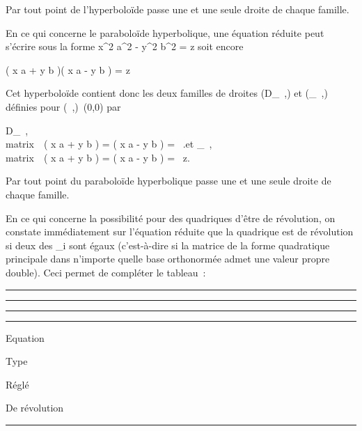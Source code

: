 \documentclass[]{article}
\begin{document}
Par tout point de l'hyperboloïde passe une et une seule droite de chaque
famille.

En ce qui concerne le paraboloïde hyperbolique, une équation réduite
peut s'écrire sous la forme  x^2 \over
a^2 - y^2 \over
b^2 = z soit encore

\left ( x \over a + y
\over b \right )\left (
x \over a - y \over b
\right ) = z

Cet hyperboloïde contient donc les deux familles de droites
(D_\lambda~,\mu) et (\Delta_\lambda~,\mu) définies pour
(\lambda~,\mu)\neq~(0,0) par

D_\lambda~,\mu \left
\\matrix\,\lambda~\left
( x \over a + y \over b
\right ) = \muz \cr \cr
\mu\left ( x \over a - y
\over b \right ) =
\lambda~\right .\quad \text et
\quad \Delta_\lambda~,\mu \left
\\matrix\,\lambda~\left
( x \over a + y \over b
\right ) = \mu \cr \cr
\mu\left ( x \over a - y
\over b \right ) =
\lambda~z\right .

Par tout point du paraboloïde hyperbolique passe une et une seule droite
de chaque famille.

En ce qui concerne la possibilité pour des quadriques d'être de
révolution, on constate immédiatement sur l'équation réduite que la
quadrique est de révolution si deux des \lambda_i sont égaux
(c'est-à-dire si la matrice de la forme quadratique principale \Phi dans
n'importe quelle base orthonormée admet une valeur propre double). Ceci
permet de compléter le tableau~:

\begin{center}\rule{3in}{0.4pt}\end{center}

\begin{center}\rule{3in}{0.4pt}\end{center}

\begin{center}\rule{3in}{0.4pt}\end{center}

\begin{center}\rule{3in}{0.4pt}\end{center}

Equation

Type

Réglé

De révolution

\begin{center}\rule{3in}{0.4pt}\end{center}
\end{document}
